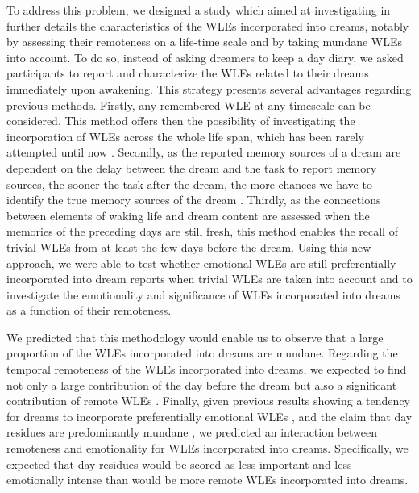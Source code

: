 To address this problem, we designed a study which aimed at investigating in further details the characteristics of the WLEs incorporated into dreams, notably by assessing their remoteness on a life-time scale and by taking mundane WLEs into account. To do so, instead of asking dreamers to keep a day diary, we asked participants to report and characterize the WLEs related to their dreams immediately upon awakening. This strategy presents several advantages regarding previous methods. Firstly, any remembered WLE at any timescale can be considered. This method offers then the possibility of investigating the incorporation of WLEs across the whole life span, which has been rarely attempted until now \citep{grenier_temporal_2005, marquardt_empirical_1996}. Secondly, as the reported memory sources of a dream are dependent on the delay between the dream and the task to report memory sources, the sooner the task after the dream, the more chances we have to identify the true memory sources of the dream \citep{cavallero_dream_1987}. Thirdly, as the connections between elements of waking life and dream content are assessed when the memories of the preceding days are still fresh, this method enables the recall of trivial WLEs from at least the few days before the dream. Using this new approach, we were able to test whether emotional WLEs are still preferentially incorporated into dream reports when trivial WLEs are taken into account and to investigate the emotionality and significance of WLEs incorporated into dreams as a function of their remoteness.

We predicted that this methodology would enable us to observe that a large proportion of the WLEs incorporated into dreams are mundane. Regarding the temporal remoteness of the WLEs incorporated into dreams, we expected to find not only a large contribution of the day before the dream \citep{marquardt_empirical_1996} but also a significant contribution of remote WLEs \citep{verdone_temporal_1965, grenier_temporal_2005, llewellyn_such_2013}. Finally, given previous results showing a tendency for dreams to incorporate preferentially emotional WLEs \citep{schredl_factors_2006, malinowski_evidence_2014}, and the claim that day residues are predominantly mundane \citep{freud_interpretation_1900}, we predicted an interaction between remoteness and emotionality for WLEs incorporated into dreams. Specifically, we expected that day residues would be scored as less important and less emotionally intense than would be more remote WLEs incorporated into dreams.

